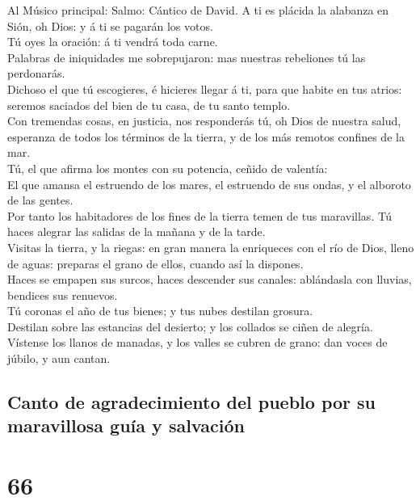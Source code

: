  Al Músico principal: Salmo: Cántico de David. A ti es
plácida la alabanza en Sión, oh Dios: y á ti se pagarán los votos.\\
 Tú oyes la oración: á ti vendrá toda carne.\\
 Palabras de iniquidades me sobrepujaron: mas nuestras
rebeliones tú las perdonarás.\\
 Dichoso el que tú escogieres, é hicieres llegar á ti,
para que habite en tus atrios: seremos saciados del bien de tu casa, de
tu santo templo.\\
 Con tremendas cosas, en justicia, nos responderás tú, oh
Dios de nuestra salud, esperanza de todos los términos de la tierra, y
de los más remotos confines de la mar.\\
 Tú, el que afirma los montes con su potencia, ceñido de
valentía:\\
 El que amansa el estruendo de los mares, el estruendo de
sus ondas, y el alboroto de las gentes.\\
 Por tanto los habitadores de los fines de la tierra temen
de tus maravillas. Tú haces alegrar las salidas de la mañana y de la
tarde.\\
 Visitas la tierra, y la riegas: en gran manera la
enriqueces con el río de Dios, lleno de aguas: preparas el grano de
ellos, cuando así la dispones.\\
 Haces se empapen sus surcos, haces descender sus
canales: ablándasla con lluvias, bendices sus renuevos.\\
 Tú coronas el año de tus bienes; y tus nubes destilan
grosura.\\
 Destilan sobre las estancias del desierto; y los
collados se ciñen de alegría.\\
 Vístense los llanos de manadas, y los valles se cubren
de grano: dan voces de júbilo, y aun cantan.

\hypertarget{canto-de-agradecimiento-del-pueblo-por-su-maravillosa-guuxeda-y-salvaciuxf3n}{%
\subsection{Canto de agradecimiento del pueblo por su maravillosa guía y
salvación}\label{canto-de-agradecimiento-del-pueblo-por-su-maravillosa-guuxeda-y-salvaciuxf3n}}

\hypertarget{section-65}{%
\section{66}\label{section-65}}


